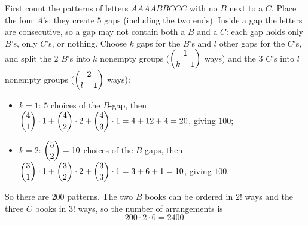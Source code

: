 First count the patterns of letters $AAAABBCCC$ with no $B$ next to a $C$. Place the four $A$'s; they create $5$ gaps (including the two ends). Inside a gap the letters are consecutive, so a gap may not contain both a $B$ and a $C$: each gap holds only $B$'s, only $C$'s, or nothing. Choose $k$ gaps for the $B$'s and $l$ other gaps for the $C$'s, and split the $2$ $B$'s into $k$ nonempty groups ($\dbinom{1}{k-1}$ ways) and the $3$ $C$'s into $l$ nonempty groups ($\dbinom{2}{l-1}$ ways):
\begin{itemize}
\item $k=1$: $5$ choices of the $B$-gap, then $\dbinom41\cdot1+\dbinom42\cdot2+\dbinom43\cdot1=4+12+4=20$, giving $100$;
\item $k=2$: $\dbinom52=10$ choices of the $B$-gaps, then $\dbinom31\cdot1+\dbinom32\cdot2+\dbinom33\cdot1=3+6+1=10$, giving $100$.
\end{itemize}
So there are $200$ patterns. The two $B$ books can be ordered in $2!$ ways and the three $C$ books in $3!$ ways, so the number of arrangements is
\[200\cdot2\cdot6=\boxed{2400}.\]
